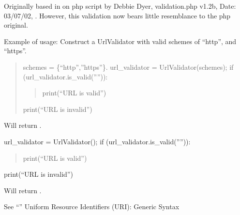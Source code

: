 \documentclass[letterpaper,10pt,english]{sphinxmanual}
\begin{document}
\begin{fulllineitems}
\begin{description}
\begin{itemize}
\begin{description}
\end{description}

\end{itemize}

\end{description}

\sphinxAtStartPar
Originally based in on php script by Debbie Dyer, validation.php v1.2b, Date: 03/07/02,
. However, this validation now bears little resemblance to the php original.

\sphinxAtStartPar
Example of usage:
Construct a UrlValidator with valid schemes of “http”, and “https”.
\begin{quote}

\sphinxAtStartPar
schemes = \{“http”,”https”\}.
url\_validator = UrlValidator(schemes);
if (url\_validator.is\_valid(””)):
\begin{quote}

\sphinxAtStartPar
print(“URL is valid”)
\end{quote}
\begin{description}
\sphinxAtStartPar
print(“URL is invalid”)

\end{description}
\end{quote}

\sphinxAtStartPar
Will return .
\begin{description}
\sphinxAtStartPar
url\_validator = UrlValidator();
if (url\_validator.is\_valid(””)):
\begin{quote}

\sphinxAtStartPar
print(“URL is valid”)
\end{quote}
\begin{description}
\sphinxAtStartPar
print(“URL is invalid”)

\end{description}

\end{description}

\sphinxAtStartPar
Will return .

\sphinxAtStartPar
See “”
Uniform Resource Identifiers (URI): Generic Syntax


\begin{fulllineitems}


\end{fulllineitems}
\end{fulllineitems}
\end{document}
